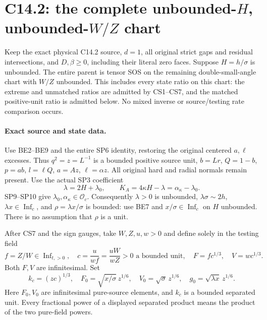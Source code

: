\section{C14.2: the complete unbounded-$H$, unbounded-$W/Z$ chart}

\begin{proposition}
Keep the exact physical C14.2 source, $d=1$, all original strict
gaps and residual intersections, and $D,\beta\ge0$, including their
literal zero faces.  Suppose $H=h/\sigma$ is unbounded.  The entire
parent is tensor SOS on the remaining double-small-angle chart with
$W/Z$ unbounded.  This includes every state ratio on this chart:
the extreme and unmatched ratios are admitted by CS1--CS7, and the
matched positive-unit ratio is admitted below.  No mixed inverse or
source/testing rate comparison occurs.
\end{proposition}

\paragraph{Exact source and state data.}
Use BE2--BE9 and the entire SP6 identity, restoring the original
centered $a,\ell$ excesses.  Thus $q^2=z=L^{-1}$ is a bounded
positive source unit, $b=Lr$, $Q=1-b$, $p=ab$, $l=\ell Q$,
$a=Az$, $\ell=\alpha z$.  All original hard and radial normals
remain present.  Use the actual SP3 coefficient
\[
 \lambda=2H+\lambda_0,
 \qquad K_A=4\kappa H-\lambda=\alpha_\kappa-\lambda_0.
                                                               \tag{CT1}
\]
SP9--SP10 give $\lambda_0,\alpha_\kappa\in\mathcal O_c$.
Consequently $\lambda>0$ is unbounded, $\lambda\sigma\sim2h$,
$\lambda x\in\operatorname{Inf}_c$, and
$\rho=\lambda x/\sigma$ is bounded: use BE7 and
$x/\sigma\in\operatorname{Inf}_c$ on $H$ unbounded.
There is no assumption that $\rho$ is a unit.

After CS7 and the sign gauges, take $W,Z,u,w>0$ and define solely
in the testing field
\[
 f=Z/W\in\operatorname{Inf}_{t,>0},\quad
 c=\frac{u}{wf}=\frac{uW}{wZ}>0\text{ a bounded unit},\quad
 F=fc^{1/3},\quad V=wc^{1/3}.
\]
Both $F,V$ are infinitesimal.  Set
\[
 k_c=(zc)^{1/3},\quad
 F_0=\sqrt{x/\sigma}\,z^{1/6},\quad
 V_0=\sqrt\sigma\,z^{1/6},\quad
 g_0=\sqrt{\lambda x}\,z^{1/6}.
                                                               \tag{CT2}
\]
Here $F_0,V_0$ are infinitesimal pure-source elements, and $k_c$ is
a bounded separated unit.  Every fractional power of a displayed
separated product means the product of the two pure-field powers.


